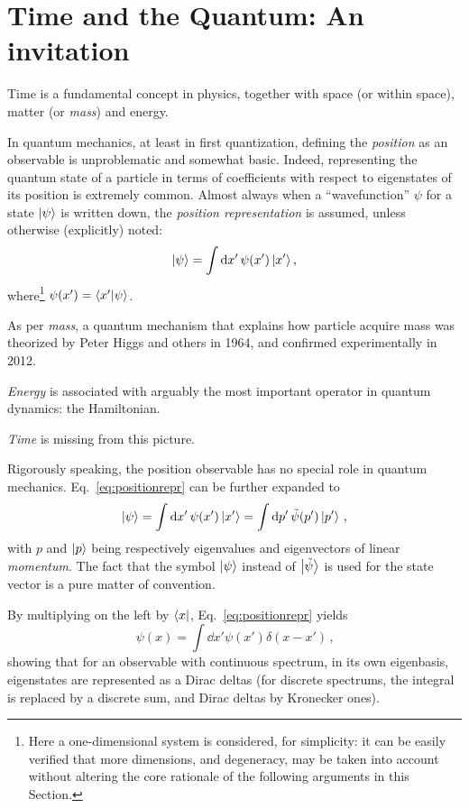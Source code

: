 \section{Time and the Quantum: An invitation}

Time is a fundamental concept in physics, together with space (or  within space),
matter (or \emph{mass}) and energy.

In quantum mechanics, at least in first quantization, defining the \emph{position} as
an observable is unproblematic and somewhat basic.
Indeed, representing the quantum state of a particle
in terms of coefficients with respect to eigenstates of its position is extremely common.
Almost always when a ``wavefunction'' $\psi$
for a state $\ket{\psi}$
is written down, the \emph{position representation}
is assumed, unless otherwise (explicitly) noted:
\begin{equation}\label{eq:positionrepr}
  \ket{\psi} = \int \dd{x'} \psi(x') \ket{x'} \text{,}
\end{equation}
where\footnote{
  Here a one-dimensional system is considered, for simplicity:
  it can be easily verified that more dimensions,
  and degeneracy, may be taken into account without altering the core rationale of the
  following arguments in this Section.
}
$\psi(x') = \braket{x'}{\psi}$.

As per \emph{mass}, a quantum mechanism that explains how particle acquire mass was theorized by
Peter Higgs and others in 1964, and confirmed experimentally in 2012.

\emph{Energy} is associated with arguably the most important operator in quantum dynamics: the Hamiltonian.

\emph{Time} is missing from this picture.

Rigorously speaking, the position observable has no special role in quantum mechanics.
Eq.~\eqref{eq:positionrepr} can be further expanded to
\begin{equation}\label{eq:qprepr}
  \ket{\psi} = \int \dd{x'} \psi(x') \ket{x'} = \int \dd{p'} \tilde{\psi}(p') \ket{p'} \,\text{,}
\end{equation}
with $p$ and $\ket{p}$ being respectively eigenvalues and eigenvectors of linear \emph{momentum}.
The fact that the symbol $\ket{\psi}$ instead of $\ket{\tilde{\psi}}$
is used for the state vector is a pure matter of convention.

By multiplying on the left by $\bra{x}$, Eq.~\eqref{eq:positionrepr} yields
\begin{equation}\label{eq:diracdeltax}
  \psi(x) = \int \dd{x'} \psi(x') \delta(x-x') \,\text{,}
\end{equation}
showing that for an observable with continuous spectrum,
in its own eigenbasis, eigenstates are represented as a Dirac deltas
(for discrete spectrums, the integral is replaced by a discrete sum,
and Dirac deltas by Kronecker ones).

